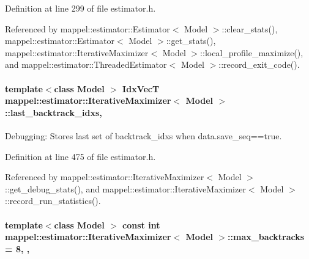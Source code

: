 Definition at line 299 of file estimator.\+h.



Referenced by mappel\+::estimator\+::\+Estimator$<$ Model $>$\+::clear\+\_\+stats(), mappel\+::estimator\+::\+Estimator$<$ Model $>$\+::get\+\_\+stats(), mappel\+::estimator\+::\+Iterative\+Maximizer$<$ Model $>$\+::local\+\_\+profile\+\_\+maximize(), and mappel\+::estimator\+::\+Threaded\+Estimator$<$ Model $>$\+::record\+\_\+exit\+\_\+code().

\paragraph[{\texorpdfstring{last\+\_\+backtrack\+\_\+idxs}{last_backtrack_idxs}}]{\setlength{\rightskip}{0pt plus 5cm}template$<$class Model $>$ {\bf Idx\+VecT} {\bf mappel\+::estimator\+::\+Iterative\+Maximizer}$<$ Model $>$\+::last\+\_\+backtrack\+\_\+idxs\hspace{0.3cm}{\ttfamily [protected]}, {\ttfamily [inherited]}}\hypertarget{classmappel_1_1estimator_1_1IterativeMaximizer_aae10373b4dc244c435059bbc6b0d9704}{}\label{classmappel_1_1estimator_1_1IterativeMaximizer_aae10373b4dc244c435059bbc6b0d9704}


Debugging\+: Stores last set of backtrack\+\_\+idxs when data.\+save\+\_\+seq==true. 



Definition at line 475 of file estimator.\+h.



Referenced by mappel\+::estimator\+::\+Iterative\+Maximizer$<$ Model $>$\+::get\+\_\+debug\+\_\+stats(), and mappel\+::estimator\+::\+Iterative\+Maximizer$<$ Model $>$\+::record\+\_\+run\+\_\+statistics().

\paragraph[{\texorpdfstring{max\+\_\+backtracks}{max_backtracks}}]{\setlength{\rightskip}{0pt plus 5cm}template$<$class Model $>$ const int {\bf mappel\+::estimator\+::\+Iterative\+Maximizer}$<$ Model $>$\+::max\+\_\+backtracks = 8\hspace{0.3cm}{\ttfamily [static]}, {\ttfamily [protected]}, {\ttfamily [inherited]}}\hypertarget{classmappel_1_1estimator_1_1IterativeMaximizer_ac26f7b7965a26fa21f07732c3b1d727e}{}\label{classmappel_1_1estimator_1_1IterativeMaximizer_ac26f7b7965a26fa21f07732c3b1d727e}


